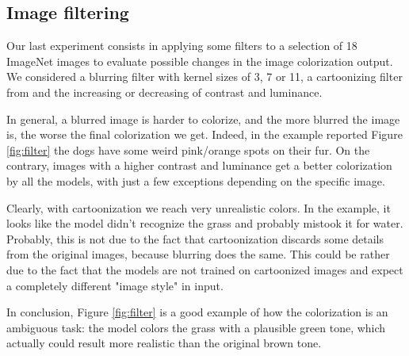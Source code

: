 \subsection{Image filtering}
\label{section:filtering}

Our last experiment consists in applying some filters to a selection of 18 ImageNet images to evaluate possible changes in the image colorization output. We considered a blurring filter with kernel sizes of 3, 7 or 11, a cartoonizing filter from \cite{cartoonize} and the increasing or decreasing of contrast and luminance.

In general, a blurred image is harder to colorize, and the more blurred the image is, the worse
the final colorization we get. Indeed, in the example reported Figure \ref{fig:filter} the dogs have some weird pink/orange
spots on their fur.
On the contrary, images with a higher contrast and luminance get a better colorization
by all the models, with just a few exceptions depending on the specific image.

Clearly, with cartoonization we reach very unrealistic colors. In the example, it looks like the model
didn't recognize the grass and probably mistook it for water. Probably, this is not due to the fact that cartoonization
discards some details from the original images, because blurring does the same. This could be rather due to the
fact that the models are not trained on cartoonized images and expect a completely different "image style" in input.

In conclusion, Figure \ref{fig:filter} is a good example of how the colorization is an ambiguous task: the model colors the grass with a plausible green tone, which actually could result more realistic than the original brown tone.

